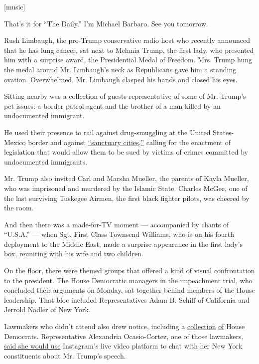 {[}music{]}

That's it for ``The Daily.'' I'm Michael Barbaro. See you tomorrow.

Rush Limbaugh, the pro-Trump conservative radio host who recently
announced that he has lung cancer, sat next to Melania Trump, the first
lady, who presented him with a surprise award, the Presidential Medal of
Freedom. Mrs. Trump hung the medal around Mr. Limbaugh's neck as
Republicans gave him a standing ovation. Overwhelmed, Mr. Limbaugh
clasped his hands and closed his eyes.

Sitting nearby was a collection of guests representative of some of Mr.
Trump's pet issues: a border patrol agent and the brother of a man
killed by an undocumented immigrant.

He used their presence to rail against drug-smuggling at the United
States-Mexico border and against
\href{https://www.nytimes3xbfgragh.onion/interactive/2016/09/02/us/sanctuary-cities.html}{``sanctuary
cities,''} calling for the enactment of legislation that would allow
them to be sued by victims of crimes committed by undocumented
immigrants.

Mr. Trump also invited Carl and Marsha Mueller, the parents of Kayla
Mueller, who was imprisoned and murdered by the Islamic State. Charles
McGee, one of the last surviving Tuskegee Airmen, the first black
fighter pilots, was cheered by the room.

And then there was a made-for-TV moment --- accompanied by chants of
``U.S.A.'' --- when Sgt. First Class Townsend Williams, who is on his
fourth deployment to the Middle East, made a surprise appearance in the
first lady's box, reuniting with his wife and two children.

On the floor, there were themed groups that offered a kind of visual
confrontation to the president. The House Democratic managers in the
impeachment trial, who concluded their arguments on Monday, sat together
behind members of the House leadership. That bloc included
Representatives Adam B. Schiff of California and Jerrold Nadler of New
York.

Lawmakers who didn't attend also drew notice, including a
\href{https://twitter.com/AyannaPressley/status/1224795509711425536}{collection}
\href{https://twitter.com/RepMaxineWaters/status/1224802310259429377}{of}
House Democrats. Representative Alexandria Ocasio-Cortez, one of those
lawmakers,
\href{https://twitter.com/AOC/status/1224794863125848065}{said she would
use} Instagram's live video platform to chat with her New York
constituents about Mr. Trump's speech.

